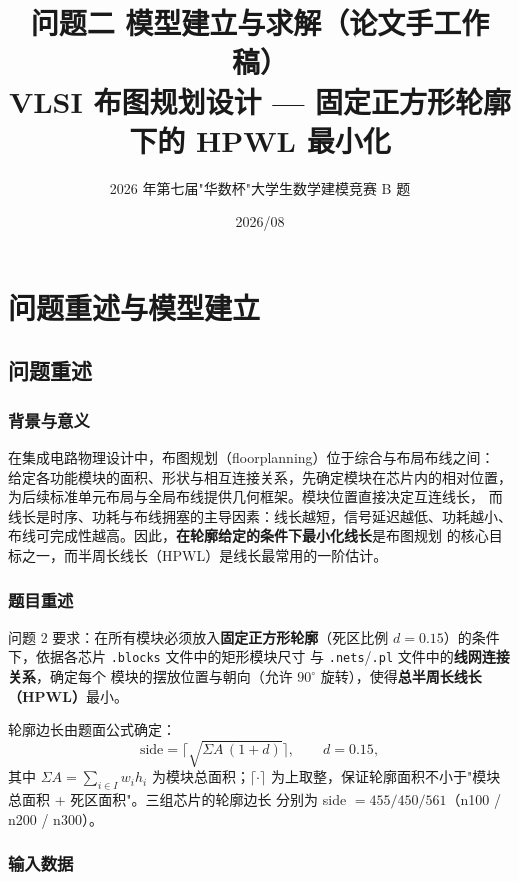 \documentclass[12pt,a4paper]{article}
\title{\textbf{问题二 模型建立与求解（论文手工作稿）}\\[6pt]
\large VLSI 布图规划设计 --- 固定正方形轮廓下的 HPWL 最小化}
\author{2026 年第七届"华数杯"大学生数学建模竞赛 B 题}
\date{2026/08}
\begin{document}
\maketitle
\tableofcontents
\newpage

\section{问题重述与模型建立}

\subsection{问题重述}

\subsubsection*{背景与意义}

在集成电路物理设计中，布图规划（floorplanning）位于综合与布局布线之间：
给定各功能模块的面积、形状与相互连接关系，先确定模块在芯片内的相对位置，
为后续标准单元布局与全局布线提供几何框架。模块位置直接决定互连线长，
而线长是时序、功耗与布线拥塞的主导因素：线长越短，信号延迟越低、功耗越小、
布线可完成性越高。因此，\textbf{在轮廓给定的条件下最小化线长}是布图规划
的核心目标之一，而半周长线长（HPWL）是线长最常用的一阶估计。

\subsubsection*{题目重述}

问题 2 要求：在所有模块必须放入\textbf{固定正方形轮廓}（死区比例
$d = 0.15$）的条件下，依据各芯片 \texttt{.blocks} 文件中的矩形模块尺寸
与 \texttt{.nets}/\texttt{.pl} 文件中的\textbf{线网连接关系}，确定每个
模块的摆放位置与朝向（允许 $90^\circ$ 旋转），使得\textbf{总半周长线长
（HPWL）}最小。

轮廓边长由题面公式确定：
\begin{equation}
\label{eq:side}
\text{side} = \Big\lceil \sqrt{\Sigma A\,(1+d)} \Big\rceil, \qquad d = 0.15,
\end{equation}
其中 $\Sigma A = \sum_{i \in I} w_i h_i$ 为模块总面积；$\lceil\cdot\rceil$
为上取整，保证轮廓面积不小于"模块总面积 + 死区面积"。三组芯片的轮廓边长
分别为 side $= 455 / 450 / 561$（n100 / n200 / n300）。

\subsubsection*{输入数据}
\end{document}
